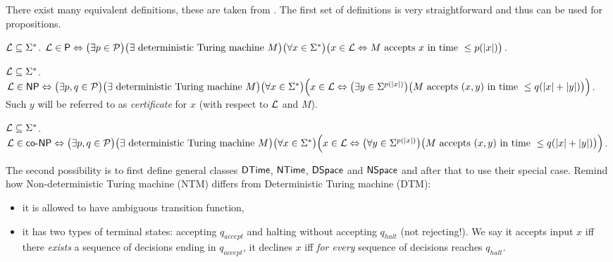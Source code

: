 		There exist many equivalent definitions, these are taken from \cite{book_comp}. The first set of definitions is very straightforward and thus can be used for propositions.
		
		\begin{defn}\label{def:P}
			${\cal L} \subseteq \Sigma^*$. ${\cal L} \in \P \iff \bigl(\exists p \in {\cal P}\bigr) \bigl(\exists \textnormal{ deterministic Turing machine } M\bigr)\\ \bigl(\forall x \in \Sigma^*\bigr) \bigl(x \in {\cal L} \iff M \textnormal{ accepts } x \textnormal{ in time } \leq p(|x|)\bigr)$.
		\end{defn}
		
		\begin{defn}\label{def:NP}
			${\cal L} \subseteq \Sigma^*$. ${\cal L} \in \NP \iff \bigl(\exists p, q \in {\cal P}\bigr) \bigl(\exists \textnormal{ deterministic Turing machine } M\bigr)\\ \bigl(\forall x \in \Sigma^*\bigr) \Bigl(x \in {\cal L} \iff \bigl(\exists y \in \Sigma^{p(|x|)}\bigr) \bigl(M \textnormal{ accepts } (x,y) \textnormal{ in time } \leq q(|x|+|y|)\bigr)\Bigr)$.\\
			Such $y$ will be referred to as {\em certificate} for $x$ (with respect to $\cal L$ and $M$).
		\end{defn}
		
		\begin{defn}\label{def:coNP}
			${\cal L} \subseteq \Sigma^*$. ${\cal L} \in \coNP \iff \bigl(\exists p, q \in {\cal P}\bigr) \bigl(\exists \textnormal{ deterministic Turing machine } M\bigr)\\ \bigl(\forall x \in \Sigma^*\bigr) \Bigl(x \in {\cal L} \iff \bigl(\forall y \in \Sigma^{p(|x|)}\bigr) \bigl(M \textnormal{ accepts } (x,y) \textnormal{ in time } \leq q(|x|+|y|)\bigr)\Bigr)$.
		\end{defn}
		
		The second possibility is to first define general classes $\DTime$, $\NTime$, $\DSpace$ and $\NSpace$ and after that to use their special case. Remind how Non-deterministic Turing machine (NTM) differs from Deterministic Turing machine (DTM):
		\begin{itemize}
			\item it is allowed to have ambiguous transition function,
			\item it has two types of terminal states: accepting $q_{accept}$ and halting without accepting $q_{halt}$ (not rejecting!). We say it accepts input $x$ iff there {\em exists} a sequence of decisions ending in $q_{accept}$, it declines $x$ iff {\em for every} sequence of decisions reaches $q_{halt}$.
		\end{itemize}
		

